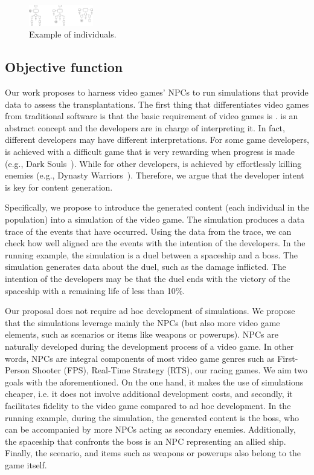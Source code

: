 \begin{figure}[tb]
    \centering
    \includegraphics[width=0.25\textwidth]{Figures/candidates.png}
    \caption{Example of individuals.}
    \label{fig:candidates}
\end{figure}

\subsection{Objective function}

Our work proposes to harness video games' NPCs to run simulations that provide data to assess the transplantations. The first thing that differentiates video games from traditional software is that the basic requirement of video games is .  is an abstract concept and the developers are in charge of interpreting it. In fact, different developers may have different interpretations. For some game developers,  is achieved with a difficult game that is very rewarding when progress is made (e.g., Dark Souls~\cite{darksouls}). While for other developers,  is achieved by effortlessly killing enemies (e.g., Dynasty Warriors~\cite{dynastywarriors}). Therefore, we argue that the developer intent is key for content generation.

Specifically, we propose to introduce the generated content (each individual in the population) into a simulation of the video game. The simulation produces a data trace of the events that have occurred. Using the data from the trace, we can check how well aligned are the events with the intention of the developers. In the running example, the simulation is a duel between a spaceship and a boss. The simulation generates data about the duel, such as the damage inflicted. The intention of the developers may be that the duel ends with the victory of the spaceship with a remaining life of less than 10\%.

Our proposal does not require ad hoc development of simulations. We propose that the simulations leverage mainly the NPCs (but also more video game elements, such as scenarios or items like weapons or powerups). NPCs are naturally developed during the development process of a video game. In other words, NPCs are integral components of  most video game genres such as First-Person Shooter (FPS), Real-Time Strategy (RTS), our racing games. We aim two goals with the aforementioned. On the one hand, it makes the use of simulations cheaper, i.e. it does not involve additional development costs, and secondly, it facilitates fidelity to the video game compared to ad hoc development. In the running example, during the simulation, the generated content is the boss, who can be accompanied by more NPCs acting as secondary enemies. Additionally, the spaceship that confronts the boss is an NPC representing an allied ship. Finally, the scenario, and items such as weapons or powerups also belong to the game itself.

